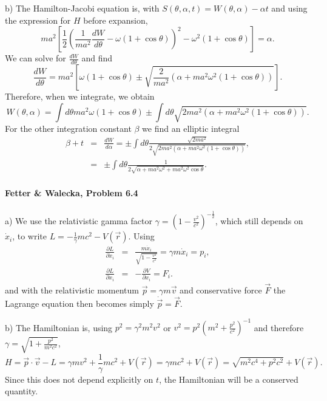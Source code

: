 \documentclass[letterpaper,11pt]{article}
\begin{document}
b) The Hamilton-Jacobi equation is, with $S(\theta,\alpha,t) = W(\theta,\alpha) - \alpha t$ and using the expression for $H$ before expansion,
\begin{equation*}
 ma^2 \left[\frac{1}{2} \left(\frac{1}{ma^2}\frac{d W}{d\theta} - \omega (1+\cos\theta)\right)^2 - \omega^2(1+\cos\theta)\right] = \alpha.
\end{equation*}
We can solve for $\frac{d W}{d\theta}$ and find
\begin{equation*}
 \frac{d W}{d\theta} = ma^2 \left[\omega(1 + \cos\theta) \pm \sqrt{\frac{2}{ma^2}\left(\alpha + ma^2\omega^2(1+\cos\theta)\right)}\right].
\end{equation*}
Therefore, when we integrate, we obtain
\begin{equation*}
 W(\theta,\alpha) = \int d\theta ma^2\omega(1 + \cos\theta) \pm \int d\theta \sqrt{2ma^2\left(\alpha + ma^2\omega^2\left(1 + \cos\theta\right)\right)}.
\end{equation*}
For the other integration constant $\beta$ we find an elliptic integral
\begin{eqnarray*}
 \beta + t & = & \frac{d W}{d\alpha} = \pm \int d\theta \frac{\sqrt{2ma^2}}{2\sqrt{2ma^2\left(\alpha + ma^2\omega^2\left(1 + \cos\theta\right)\right)}}, \\
 & =  & \pm \int d\theta \frac{1}{2\sqrt{\alpha + ma^2\omega^2 + ma^2\omega^2\cos\theta}}.
\end{eqnarray*}

\paragraph*{Fetter \& Walecka, Problem 6.4}
a) We use the relativistic gamma factor $\gamma = \left(1-\frac{v^2}{c^2}\right)^{-\frac{1}{2}}$, which still depends on $\dot{x}_i$, to write $L = -\frac{1}{\gamma}mc^2 - V(\vec{r})$.  Using
\begin{eqnarray*}
 \frac{\partial L}{\partial \dot{x}_i} & = & \frac{m \dot{x}_i}{\sqrt{1-\frac{v^2}{c^2}}} = \gamma m \dot{x}_i = p_i, \\
 \frac{\partial L}{\partial x_i} & = & -\frac{\partial V}{\partial x_i} = F_i.
\end{eqnarray*}
and with the relativistic momentum $\vec{p} = \gamma m \vec{v}$ and conservative force $\vec{F}$ the Lagrange equation then becomes simply $\dot{\vec{p}} = \vec{F}$.

b) The Hamiltonian is, using $p^2 = \gamma^2 m^2 v^2$ or $v^2 = p^2\left(m^2 + \frac{p^2}{c^2}\right)^{-1}$ and therefore $\gamma = \sqrt{1 + \frac{p^2}{m^2c^2}}$,
\begin{equation*}
 H = \vec{p} \cdot \vec{v} - L = \gamma m v^2 + \frac{1}{\gamma} mc^2 + V(\vec{r}) = \gamma m c^2 + V(\vec{r}) = \sqrt{m^2 c^4 + p^2 c^2} + V(\vec{r}).
\end{equation*}
Since this does not depend explicitly on $t$, the Hamiltonian will be a conserved quantity.
\end{document}
